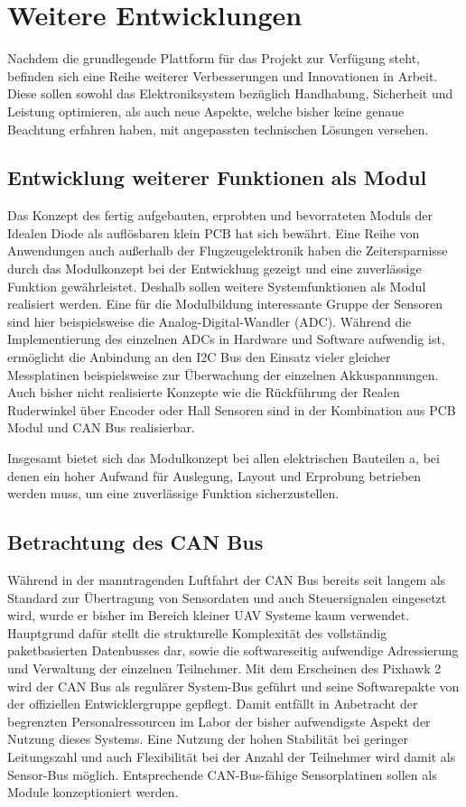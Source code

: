 \chapter{Weitere Entwicklungen}\label{cha:Weitere Entwicklungen}

Nachdem die grundlegende Plattform für das Projekt zur Verfügung steht, befinden sich eine Reihe weiterer Verbesserungen und Innovationen in Arbeit. Diese sollen sowohl das Elektroniksystem bezüglich Handhabung, Sicherheit und Leistung optimieren, als auch neue Aspekte, welche bisher keine genaue Beachtung erfahren haben, mit angepassten technischen Lösungen versehen.


\section{Entwicklung weiterer Funktionen als Modul}

Das Konzept des fertig aufgebauten, erprobten und bevorrateten Moduls der Idealen Diode als auflösbaren klein PCB hat sich bewährt. Eine Reihe von Anwendungen auch außerhalb der Flugzeugelektronik haben die Zeitersparnisse durch das Modulkonzept bei der Entwicklung gezeigt und eine zuverlässige Funktion gewährleistet.
Deshalb sollen weitere Systemfunktionen als Modul realisiert werden.
Eine für die Modulbildung interessante Gruppe der Sensoren sind hier beispielsweise die Analog-Digital-Wandler (ADC). Während die Implementierung des einzelnen ADCs in Hardware und Software aufwendig ist, ermöglicht die Anbindung an den I2C Bus den Einsatz vieler gleicher Messplatinen beispielsweise zur Überwachung der einzelnen Akkuspannungen.
Auch bisher nicht realisierte Konzepte wie die Rückführung der Realen Ruderwinkel über Encoder oder Hall Sensoren sind in der Kombination aus PCB Modul und CAN Bus realisierbar.

Insgesamt bietet sich das Modulkonzept bei allen elektrischen Bauteilen a, bei denen ein hoher Aufwand für Auslegung, Layout und Erprobung betrieben werden muss, um eine zuverlässige Funktion sicherzustellen.

\section{Betrachtung des CAN Bus}

Während in der manntragenden Luftfahrt der CAN Bus bereits seit langem als Standard zur Übertragung von Sensordaten und auch Steuersignalen eingesetzt wird, wurde er bisher im Bereich kleiner UAV Systeme kaum verwendet. Hauptgrund dafür stellt die strukturelle  Komplexität des vollständig paketbasierten Datenbusses dar, sowie die softwareseitig aufwendige Adressierung und Verwaltung der einzelnen Teilnehmer.
Mit dem Erscheinen des Pixhawk 2 wird der CAN Bus als regulärer System-Bus geführt und seine Softwarepakte von der offiziellen Entwicklergruppe gepflegt. Damit entfällt in Anbetracht der begrenzten Personalressourcen im Labor der bisher aufwendigste Aspekt der Nutzung dieses Systems. Eine Nutzung der hohen Stabilität bei geringer Leitungszahl und auch Flexibilität bei der Anzahl der Teilnehmer wird damit als Sensor-Bus möglich.
Entsprechende CAN-Bus-fähige Sensorplatinen sollen als Module konzeptioniert werden.

